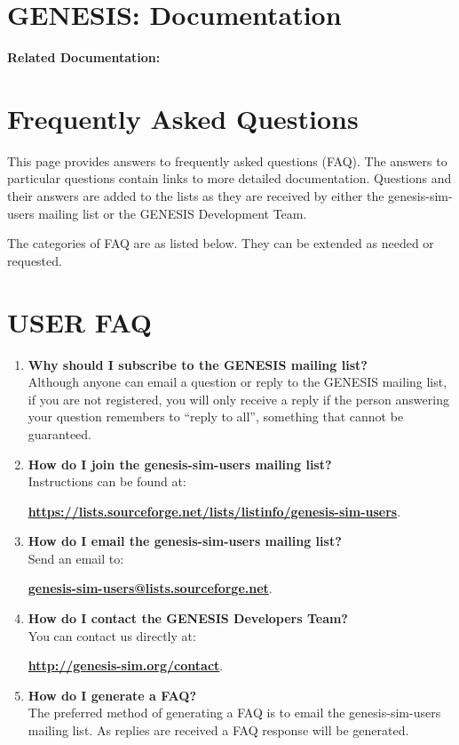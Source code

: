 \documentclass[12pt]{article}
\begin{document}
\section*{GENESIS: Documentation}

{\bf Related Documentation:}

\section*{Frequently Asked Questions}

This page provides answers to frequently asked questions (FAQ). The answers to particular questions contain links to more detailed documentation. Questions and their answers are added to the lists as they are received by either the genesis-sim-users mailing list or the GENESIS Development Team.

The categories of FAQ are as listed below. They can be extended as needed or requested.

\section*{USER FAQ}

\begin{enumerate}

\item {\bf Why should I subscribe to the GENESIS mailing list?} \\
Although anyone can email a question or reply to the GENESIS mailing list, if you are not registered, you will only receive a reply if the person answering your question remembers to ``reply to all'', something that cannot be guaranteed.

\item {\bf How do I join the genesis-sim-users mailing list?} \\
Instructions can be found at:

\href{https://lists.sourceforge.net/lists/listinfo/genesis-sim-users}{\bf https://lists.sourceforge.net/lists/listinfo/genesis-sim-users}.

\item {\bf How do I email the genesis-sim-users mailing list?} \\
Send an email to:

\href{mailto:genesis-sim-users@lists.sourceforge.net}{\bf genesis-sim-users@lists.sourceforge.net}.

\item{\bf How do I contact the GENESIS Developers Team?} \\
You can contact us directly at:

\href{http://genesis-sim.org/contact}{\bf http://genesis-sim.org/contact}.

\item {\bf How do I generate a FAQ?} \\
The preferred method of generating a FAQ is to email the genesis-sim-users mailing list. As replies are received a FAQ response will be generated.

\end{enumerate}
\end{document}
